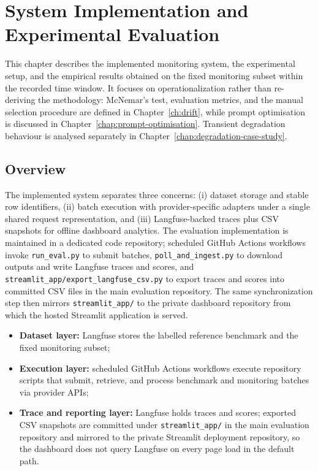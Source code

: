 \chapter{System Implementation and Experimental Evaluation}
\label{chap:system-architecture}

This chapter describes the implemented monitoring system, the experimental setup, and the empirical results obtained on the fixed monitoring subset within the recorded time window. It focuses on operationalization rather than re-deriving the methodology: McNemar's test, evaluation metrics, and the manual selection procedure are defined in Chapter~\ref{ch:drift}, while prompt optimisation is discussed in Chapter~\ref{chap:prompt-optimisation}. Transient degradation behaviour is analysed separately in Chapter~\ref{chap:degradation-case-study}.

\section{Overview}
\label{sec:evaluation-pipeline-overview}

The implemented system separates three concerns: (i) dataset storage and stable row identifiers, (ii) batch execution with provider-specific adapters under a single shared request representation, and (iii) Langfuse-backed traces plus CSV snapshots for offline dashboard analytics. The evaluation implementation is maintained in a dedicated code repository; scheduled GitHub Actions workflows invoke \texttt{run\_eval.py} to submit batches, \texttt{poll\_and\_ingest.py} to download outputs and write Langfuse traces and scores, and \texttt{streamlit\_app/export\_langfuse\_csv.py} to export traces and scores into committed CSV files in the main evaluation repository. The same synchronization step then mirrors \texttt{streamlit\_app/} to the private dashboard repository from which the hosted Streamlit application is served.

\begin{itemize}
    \item \textbf{Dataset layer:} Langfuse stores the labelled reference benchmark and the fixed monitoring subset;
    \item \textbf{Execution layer:} scheduled GitHub Actions workflows execute repository scripts that submit, retrieve, and process benchmark and monitoring batches via provider APIs;
    \item \textbf{Trace and reporting layer:} Langfuse holds traces and scores; exported CSV snapshots are committed under \texttt{streamlit\_app/} in the main evaluation repository and mirrored to the private Streamlit deployment repository, so the dashboard does not query Langfuse on every page load in the default path.
\end{itemize}

